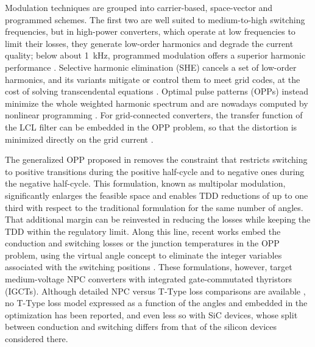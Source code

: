 \documentclass[conference]{IEEEtran}
\begin{document}
Modulation techniques are grouped into carrier-based, space-vector and
programmed schemes. The first two are well suited to medium-to-high switching
frequencies, but in high-power converters, which operate at low frequencies to
limit their losses, they generate low-order harmonics and degrade the current
quality; below about 1~kHz, programmed modulation offers a superior harmonic
performance \cite{zhang_hpm,tsekouras_tpel}. Selective harmonic elimination
(SHE) cancels a set of low-order harmonics, and its variants mitigate
\cite{franquelo_shm} or control \cite{zhou_shc} them to meet grid codes, at
the cost of solving transcendental equations \cite{wang_review}. Optimal pulse
patterns (OPPs) instead minimize the whole weighted harmonic spectrum and are
nowadays computed by nonlinear programming \cite{birth_genopp,geyer_bounded}.
For grid-connected converters, the transfer function of the LCL filter can be
embedded in the OPP problem, so that the distortion is minimized directly on
the grid current \cite{rahmanpour_lcl}.

The generalized OPP proposed in \cite{birth_genopp} removes the constraint that
restricts switching to positive transitions during the positive half-cycle and
to negative ones during the negative half-cycle. This formulation, known as
multipolar modulation, significantly enlarges the feasible space and enables TDD
reductions of up to one third with respect to the traditional formulation for
the same number of angles. That additional margin can be reinvested in reducing
the losses while keeping the TDD within the regulatory limit. Along this line,
recent works embed the conduction and switching losses
\cite{koukoula_ecce23,geyer_bounded} or the junction temperatures
\cite{dorfling_thermal,koukoula_junction} in the OPP problem, using the
virtual angle concept \cite{perez_basante_hws} to eliminate the integer
variables associated with the switching positions \cite{koukoula_junction}.
These formulations, however, target medium-voltage NPC converters with
integrated gate-commutated thyristors (IGCTs). Although detailed NPC versus
T-Type loss comparisons are available \cite{lee_npc_ttype,alemi_ttype}, no
T-Type loss model expressed as a function of the angles and embedded in the
optimization has been reported, and even less so with SiC devices, whose
split between conduction and switching differs from that of the silicon
devices considered there.
\end{document}
